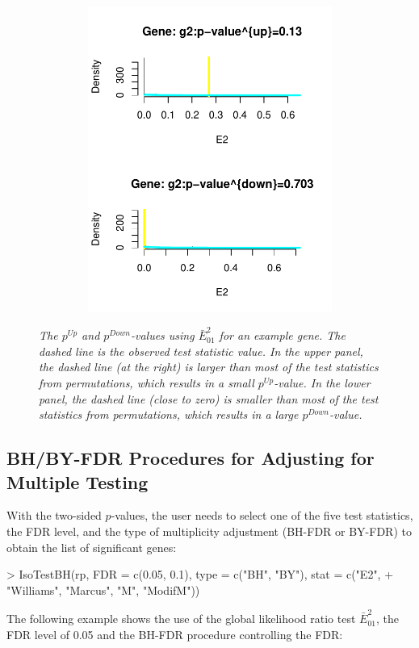 \documentclass[10pt]{mybook4}
\begin{document}
  
\begin{figure}[!h]
\centering
{\includegraphics[height=10cm,width=12cm]{IsoGene-IsopvaluePlot}}
\caption{\em{The $p^{Up}$ and $p^{Down}$-values using
$\bar{E}_{01}^2$ for an example gene. The dashed line is the
observed test statistic value. In the upper panel, the dashed line
(at the right) is larger than most of the test statistics from
permutations, which results in a small $p^{Up}$-value. In the lower
panel, the dashed line (close to zero) is smaller than most of the
test statistics from permutations, which results in a large
$p^{Down}$-value.}} \label{expvalue}
\end{figure}



\subsection{BH/BY-FDR Procedures for Adjusting for Multiple Testing}

With the two-sided $p$-values, the user needs to select one of the
five test statistics, the FDR level, and the type of multiplicity
adjustment (BH-FDR or BY-FDR) to obtain the list of significant
genes:

\begin{Schunk}
\begin{Sinput}
> IsoTestBH(rp, FDR = c(0.05, 0.1), type = c("BH", "BY"), stat = c("E2", 
+     "Williams", "Marcus", "M", "ModifM"))
\end{Sinput}
\end{Schunk}


The following example shows the use of the global likelihood ratio
test $\bar{E}^{2}_{01}$, the FDR level of 0.05 and the BH-FDR
procedure controlling the FDR: \\ \\
\end{document}
